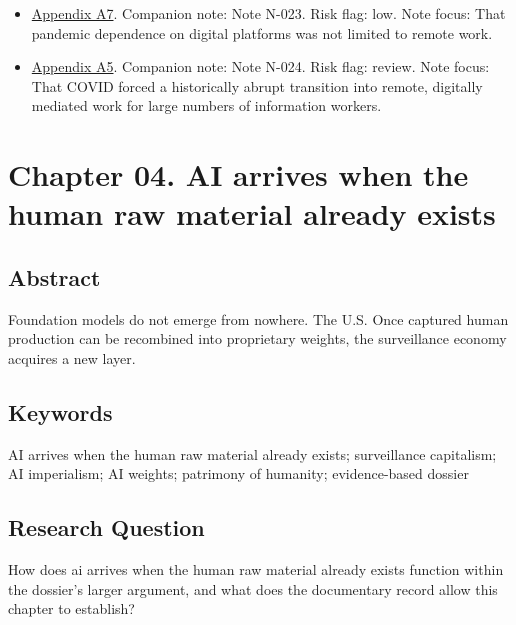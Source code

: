 \documentclass[
  american,
  11pt,
  letterpaper,
]{article}
\begin{document}
\begin{itemize}
  concrete divergence between large tech earnings and small-business
  stress.
\item
  \hyperref[ch-03-appendix-a7-what-social-media-told-about-us-in-the-time-of-covid-19-a-scoping-review]{Appendix
  A7}. Companion note: Note N-023. Risk flag: low. Note focus: That
  pandemic dependence on digital platforms was not limited to remote
  work.
\item
  \hyperref[ch-03-appendix-a5-how-work-from-home-affects-collaboration-a-large-scale-study-of-information-workers-in-a-natural-experiment-during-covid-19]{Appendix
  A5}. Companion note: Note N-024. Risk flag: review. Note focus: That
  COVID forced a historically abrupt transition into remote, digitally
  mediated work for large numbers of information workers.
\end{itemize}

\newpage

\section{Chapter 04. AI arrives when the human raw material already
exists}\label{chapter-04.-ai-arrives-when-the-human-raw-material-already-exists}

\subsection{Abstract}\label{abstract-4}

Foundation models do not emerge from nowhere. The U.S. Once captured
human production can be recombined into proprietary weights, the
surveillance economy acquires a new layer.

\subsection{Keywords}\label{keywords-4}

AI arrives when the human raw material already exists; surveillance
capitalism; AI imperialism; AI weights; patrimony of humanity;
evidence-based dossier

\subsection{Research Question}\label{research-question-4}

How does ai arrives when the human raw material already exists function
within the dossier's larger argument, and what does the documentary
record allow this chapter to establish?
\end{document}

